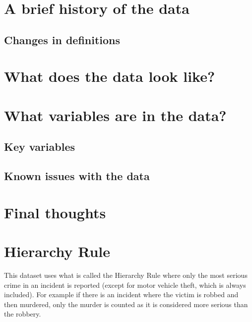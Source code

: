 \documentclass[
  12pt,
  openany]{book}
\begin{document}
\hypertarget{a-brief-history-of-the-data}{%
\section{A brief history of the data}\label{a-brief-history-of-the-data}}

\hypertarget{changes-in-definitions}{%
\subsection{Changes in definitions}\label{changes-in-definitions}}

\hypertarget{what-does-the-data-look-like}{%
\section{What does the data look like?}\label{what-does-the-data-look-like}}

\hypertarget{what-variables-are-in-the-data}{%
\section{What variables are in the data?}\label{what-variables-are-in-the-data}}

\hypertarget{key-variables}{%
\subsection{Key variables}\label{key-variables}}

\hypertarget{known-issues-with-the-data}{%
\subsection{Known issues with the data}\label{known-issues-with-the-data}}

\hypertarget{final-thoughts}{%
\section{Final thoughts}\label{final-thoughts}}

\hypertarget{hierarchy-rule}{%
\section{Hierarchy Rule}\label{hierarchy-rule}}

This dataset uses what is called the Hierarchy Rule where only the most serious crime in an incident is reported (except for motor vehicle theft, which is always included). For example if there is an incident where the victim is robbed and then murdered, only the murder is counted as it is considered more serious than the robbery.
\end{document}
